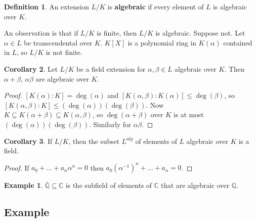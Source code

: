 \documentclass{article}
\newcommand{\Q}{\mathbb{Q}}
\newcommand{\C}{\mathbb{C}}
\newcommand{\rb}[1]{\left( #1 \right)}
\renewcommand{\sb}[1]{\left[ #1 \right]}
\theoremstyle{definition}\newtheorem{definition}{Definition}[subsection]
\theoremstyle{definition}\newtheorem{remark}[definition]{Remark}
\theoremstyle{definition}\newtheorem*{example}{Example}
\theoremstyle{definition}\newtheorem*{note}{Note}
\newtheorem{corollary}[definition]{Corollary}
\begin{document}
\begin{definition}
An extension $ L / K $ is \textbf{algebraic} if every element of $ L $ is algebraic over $ K $.
\end{definition}

An observation is that if $ L / K $ is finite, then $ L / K $ is algebraic. Suppose not. Let $ \alpha \in L $ be transcendental over $ K $. $ K\sb{X} $ is a polynomial ring in $ K\rb{\alpha} $ contained in $ L $, so $ L / K $ is not finite.

\begin{corollary}
Let $ L / K $ be a field extension for $ \alpha, \beta \in L $ algebraic over $ K $. Then $ \alpha + \beta $, $ \alpha\beta $ are algebraic over $ K $.
\end{corollary}

\begin{proof}
$ \sb{K\rb{\alpha} : K} = \deg\rb{\alpha} $ and $ \sb{K\rb{\alpha, \beta} : K\rb{\alpha}} \le \deg\rb{\beta} $, so $ \sb{K\rb{\alpha, \beta} : K} \le \rb{\deg\rb{\alpha}}\rb{\deg\rb{\beta}} $. Now $ K \subseteq K\rb{\alpha + \beta} \subseteq K\rb{\alpha, \beta} $, so $ \deg\rb{\alpha + \beta} $ over $ K $ is at most $ \rb{\deg\rb{\alpha}}\rb{\deg\rb{\beta}} $. Similarly for $ \alpha\beta $.
\end{proof}

\begin{corollary}
If $ L / K $, then the subset $ L^{alg} $ of elements of $ L $ algebraic over $ K $ is a field.
\end{corollary}

\begin{proof}
If $ a_0 + \dots + a_n\alpha^n = 0 $ then $ a_0\rb{\alpha^{-1}}^n + \dots + a_n = 0 $.
\end{proof}

\begin{example}
$ \bar{\Q} \subseteq \C $ is the subfield of elements of $ \C $ that are algebraic over $ \Q $.
\end{example}

\subsection{Example}
\end{document}
